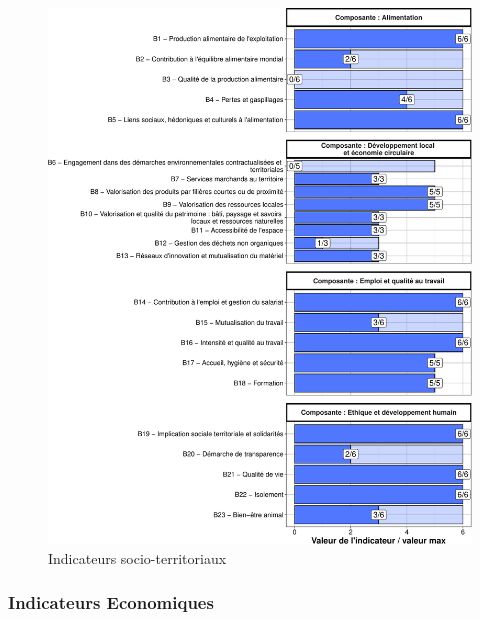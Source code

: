 \documentclass[]{article}
\begin{document}
\begin{figure}[H]
\includegraphics[width=1\linewidth]{report_files/figure-latex/unnamed-chunk-7-1} \caption{Indicateurs socio-territoriaux}\label{fig:unnamed-chunk-7}
\end{figure}

\hypertarget{indicateurs-economiques}{%
\subsubsection{Indicateurs Economiques}\label{indicateurs-economiques}}
\end{document}
